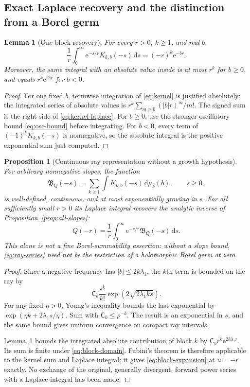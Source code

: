 \documentclass[11pt,a4paper]{article}
\numberwithin{equation}{section}
\newtheorem{proposition}[theorem]{Proposition}
\newtheorem{lemma}[theorem]{Lemma}
\theoremstyle{definition}
\theoremstyle{remark}
\newcommand{\ee}{\mathrm e}
\newcommand{\dd}{\mathrm d}
\newcommand{\sh}{\mathsf C}
\begin{document}
\subsection{Exact Laplace recovery and the distinction from a Borel germ}
\begin{lemma}[One-block recovery]
\label{lem:kernel-laplace}
For every $r>0$, $k\ge1$, and real $b$,
\begin{equation}
 \frac1r\int_0^\infty\ee^{-s/r}K_{k,b}(-s)\,\dd s
       =(-r)^k\ee^{-br}.
 \label{eq:kernel-laplace}
\end{equation}
Moreover, the same integral with an absolute value inside is at most
$r^k$ for $b\ge0$, and equals $r^k\ee^{|b|r}$ for $b<0$.
\end{lemma}
\begin{proof}
For one fixed $b$, termwise integration of \eqref{eq:kernel} is justified
absolutely: the integrated series of absolute values is
$r^k\sum_{m\ge0}(|b|r)^m/m!$.  The signed sum is the right side of
\eqref{eq:kernel-laplace}.  For $b\ge0$, use the stronger oscillatory
bound \eqref{eq:osc-bound} before integrating.  For $b<0$, every term of
$(-1)^kK_{k,b}(-s)$ is nonnegative, so the absolute integral is the
positive exponential sum just computed.
\end{proof}

\begin{proposition}[Continuous ray representation without a growth hypothesis]
\label{prop:ray}
For arbitrary nonnegative slopes, the function
\begin{equation}
 \mathfrak B_Q(-s)=\sum_{k\ge1}\int K_{k,b}(-s)\,\dd\mu_k(b),
 \qquad s\ge0,
 \label{eq:ray-series}
\end{equation}
is well-defined, continuous, and at most exponentially growing in $s$.
For all sufficiently small $r>0$ its Laplace integral recovers the
analytic inverse of Proposition~\ref{prop:all-slopes}:
\begin{equation}
 Q(-r)=\frac1r\int_0^\infty\ee^{-s/r}\mathfrak B_Q(-s)\,\dd s.
 \label{eq:ray-recovery}
\end{equation}
This alone is \emph{not} a fine Borel-summability assertion: without a
slope bound, \eqref{eq:ray-series} need not be the restriction of a
holomorphic Borel germ at zero.
\end{proposition}
\begin{proof}
Since a negative frequency has $|b|\le2k\lambda_1$, the $k$th term is
bounded on the ray by
\[
 \sh_k\frac{s^k}{k!}\exp(2\sqrt{2\lambda_1ks}).
\]
For any fixed $\eta>0$, Young's inequality bounds the last exponential
by $\exp(\eta k+2\lambda_1s/\eta)$.  Sum with
$\sh_k\le\rho^{-k}$.  The result is an exponential in $s$, and the same
bound gives uniform convergence on compact ray intervals.

Lemma~\ref{lem:kernel-laplace} bounds the integrated absolute contribution
of block $k$ by
$\sh_kr^k\ee^{2k\lambda_1r}$.  Its sum is finite under
\eqref{eq:block-domain}.  Fubini's theorem is therefore applicable to
the kernel sum and Laplace integral; it gives \eqref{eq:block-expansion}
at $u=-r$ exactly.  No exchange of the original, generally divergent,
forward power series with a Laplace integral has been made.
\end{proof}
\end{document}
